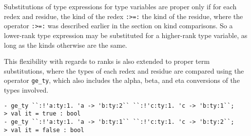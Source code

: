 Substitutions of type expressions for type variables are proper only if
for each redex and residue, the kind of the redex \texttt{:>=:}
the kind of the residue, where the \ML{} operator \texttt{:>=:} was described
earlier in the section on kind comparisons.
So a lower-rank type expression may be substituted for a higher-rank type
variable, as long as the kinds otherwise are the same.
%

This flexibility with regards to ranks is also extended to proper term
substitutions, where the types of each redex and residue are compared using
the \ML{} operator \texttt{ge\_ty}, which also includes the
alpha, beta, and eta conversions of the types involved.
%
\begin{session}
\begin{verbatim}
- ge_ty ``:!'a:ty:1. 'a -> 'b:ty:2`` ``:!'c:ty:1. 'c -> 'b:ty:1``;
> val it = true : bool
- ge_ty ``:!'a:ty:1. 'a -> 'b:ty:1`` ``:!'c:ty:1. 'c -> 'b:ty:2``;
> val it = false : bool
\end{verbatim}
\end{session}


